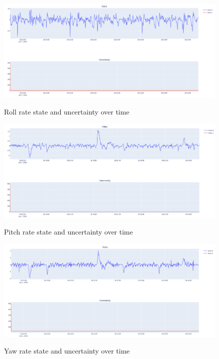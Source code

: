 \documentclass[12pt]{article}
\begin{document}
\begin{figure}[H]
    \centering
    \includegraphics[width=\linewidth]{figures/vr_uncertainty.png}\\
    \caption{Roll rate state and uncertainty over time}
    \label{fig:vr}
\end{figure}
\begin{figure}[H]
    \centering
    \includegraphics[width=\linewidth]{figures/vp_uncertainty.png}\\
    \caption{Pitch rate state and uncertainty over time}
    \label{fig:vp}
\end{figure}
\begin{figure}[H]
    \centering
    \includegraphics[width=\linewidth]{figures/vyw_uncertainty.png}\\
    \caption{Yaw rate state and uncertainty over time}
    \label{fig:vyw}
\end{figure}
\end{document}
